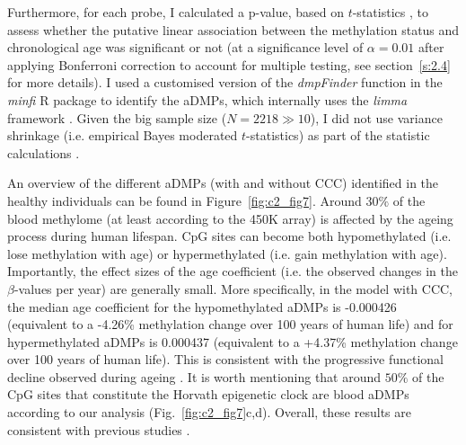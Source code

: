Furthermore, for each probe, I calculated a p-value, based on $t$-statistics \cite{Teschendorff2018}, to assess whether the putative linear association between the methylation status and chronological age was significant or not (at a significance level of $\alpha=0.01$ after applying Bonferroni correction to account for multiple testing, see section~\ref{s:2.4} for more details). I used a customised version of the \textit{dmpFinder} function in the \textit{minfi} R package \cite{Aryee2014} to identify the aDMPs, which internally uses the \textit{limma} framework \cite{Ritchie2015}. Given the big sample size ($N = 2218 \gg 10$), I did not use variance shrinkage (i.e. empirical Bayes moderated $t$-statistics) as part of the statistic calculations \cite{Ritchie2015}.  

\bigskip

An overview of the different aDMPs (with and without CCC) identified in the healthy individuals can be found in Figure~\ref{fig:c2_fig7}. Around $30\%$ of the blood methylome (at least according to the 450K array) is affected by the ageing process during human lifespan. CpG sites can become both hypomethylated (i.e. lose methylation with age) or hypermethylated (i.e. gain methylation with age). Importantly, the effect sizes of the age coefficient (i.e. the observed changes in the $\beta$-values per year) are generally small. More specifically, in the model with CCC, the median age coefficient for the hypomethylated aDMPs is -0.000426 (equivalent to a -4.26\% methylation change over 100 years of human life) and for hypermethylated aDMPs is 0.000437 (equivalent to a +4.37\% methylation change over 100 years of human life). This is consistent with the progressive functional decline observed during ageing \cite{Lopez-Otin2013}. It is worth mentioning that around $50\%$ of the CpG sites that constitute the Horvath epigenetic clock are blood aDMPs according to our analysis (Fig.~\ref{fig:c2_fig7}c,d). Overall, these results are consistent with previous studies \cite{Slieker2016,Slieker2018,Zhu2018,VanDongen2016}.

